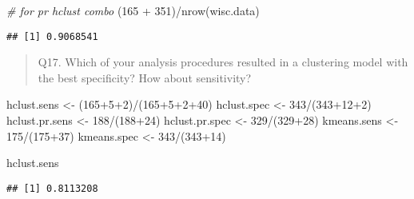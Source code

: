 \documentclass[
]{article}
\newenvironment{Shaded}{\begin{snugshade}}{\end{snugshade}}
\newcommand{\CommentTok}[1]{\textcolor[rgb]{0.56,0.35,0.01}{\textit{#1}}}
\newcommand{\DecValTok}[1]{\textcolor[rgb]{0.00,0.00,0.81}{#1}}
\newcommand{\FunctionTok}[1]{\textcolor[rgb]{0.00,0.00,0.00}{#1}}
\newcommand{\NormalTok}[1]{#1}
\newcommand{\OtherTok}[1]{\textcolor[rgb]{0.56,0.35,0.01}{#1}}
\newcommand{\SpecialCharTok}[1]{\textcolor[rgb]{0.00,0.00,0.00}{#1}}
\begin{document}
\begin{Shaded}
\begin{Highlighting}[]
\CommentTok{\# for pr hclust combo}
\NormalTok{(}\DecValTok{165} \SpecialCharTok{+} \DecValTok{351}\NormalTok{)}\SpecialCharTok{/}\FunctionTok{nrow}\NormalTok{(wisc.data)}
\end{Highlighting}
\end{Shaded}

\begin{verbatim}
## [1] 0.9068541
\end{verbatim}

\begin{quote}
Q17. Which of your analysis procedures resulted in a clustering model
with the best specificity? How about sensitivity?
\end{quote}

\begin{Shaded}
\begin{Highlighting}[]
\NormalTok{hclust.sens }\OtherTok{\textless{}{-}}\NormalTok{ (}\DecValTok{165}\SpecialCharTok{+}\DecValTok{5}\SpecialCharTok{+}\DecValTok{2}\NormalTok{)}\SpecialCharTok{/}\NormalTok{(}\DecValTok{165}\SpecialCharTok{+}\DecValTok{5}\SpecialCharTok{+}\DecValTok{2}\SpecialCharTok{+}\DecValTok{40}\NormalTok{)}
\NormalTok{hclust.spec }\OtherTok{\textless{}{-}} \DecValTok{343}\SpecialCharTok{/}\NormalTok{(}\DecValTok{343}\SpecialCharTok{+}\DecValTok{12}\SpecialCharTok{+}\DecValTok{2}\NormalTok{)}
\NormalTok{hclust.pr.sens }\OtherTok{\textless{}{-}} \DecValTok{188}\SpecialCharTok{/}\NormalTok{(}\DecValTok{188}\SpecialCharTok{+}\DecValTok{24}\NormalTok{)}
\NormalTok{hclust.pr.spec }\OtherTok{\textless{}{-}} \DecValTok{329}\SpecialCharTok{/}\NormalTok{(}\DecValTok{329}\SpecialCharTok{+}\DecValTok{28}\NormalTok{)}
\NormalTok{kmeans.sens }\OtherTok{\textless{}{-}} \DecValTok{175}\SpecialCharTok{/}\NormalTok{(}\DecValTok{175}\SpecialCharTok{+}\DecValTok{37}\NormalTok{)}
\NormalTok{kmeans.spec }\OtherTok{\textless{}{-}} \DecValTok{343}\SpecialCharTok{/}\NormalTok{(}\DecValTok{343}\SpecialCharTok{+}\DecValTok{14}\NormalTok{)}
\end{Highlighting}
\end{Shaded}

\begin{Shaded}
\begin{Highlighting}[]
\NormalTok{hclust.sens}
\end{Highlighting}
\end{Shaded}

\begin{verbatim}
## [1] 0.8113208
\end{verbatim}
\end{document}
